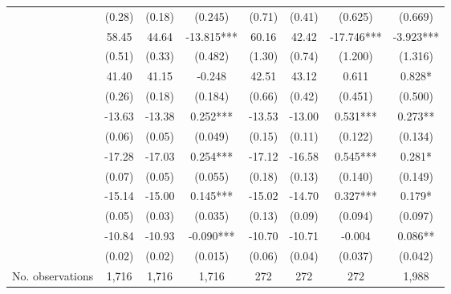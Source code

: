 \begin{table}
\begin{threeparttable}
\begin{tabular}{p{4cm}S@{}S@{}S[round-precision=3]S@{}S@{}S[round-precision=3]S[round-precision=3]}
                                          &      (0.28)&      (0.18)&     (0.245)   &      (0.71)&      (0.41)&     (0.625)   &     (0.669)   \\
            &       58.45&       44.64&     -13.815***&       60.16&       42.42&     -17.746***&      -3.923***\\
                                          &      (0.51)&      (0.33)&     (0.482)   &      (1.30)&      (0.74)&     (1.200)   &     (1.316)   \\
            \midrule
                        &       41.40&       41.15&      -0.248   &       42.51&       43.12&       0.611   &       0.828*  \\
                                          &      (0.26)&      (0.18)&     (0.184)   &      (0.66)&      (0.42)&     (0.451)   &     (0.500)   \\
                &      -13.63&      -13.38&       0.252***&      -13.53&      -13.00&       0.531***&       0.273** \\
                                          &      (0.06)&      (0.05)&     (0.049)   &      (0.15)&      (0.11)&     (0.122)   &     (0.134)   \\
                   &      -17.28&      -17.03&       0.254***&      -17.12&      -16.58&       0.545***&       0.281*  \\
                                          &      (0.07)&      (0.05)&     (0.055)   &      (0.18)&      (0.13)&     (0.140)   &     (0.149)   \\
                          &      -15.14&      -15.00&       0.145***&      -15.02&      -14.70&       0.327***&       0.179*  \\
                                          &      (0.05)&      (0.03)&     (0.035)   &      (0.13)&      (0.09)&     (0.094)   &     (0.097)   \\
                    &      -10.84&      -10.93&      -0.090***&      -10.70&      -10.71&      -0.004   &       0.086** \\
                                          &      (0.02)&      (0.02)&     (0.015)   &      (0.06)&      (0.04)&     (0.037)   &     (0.042)   \\
            \midrule
            No. observations              &       1,716&       1,716&       1,716   &         272&         272&         272   &       1,988   \\

\end{tabular}
\end{threeparttable}
\end{table}
